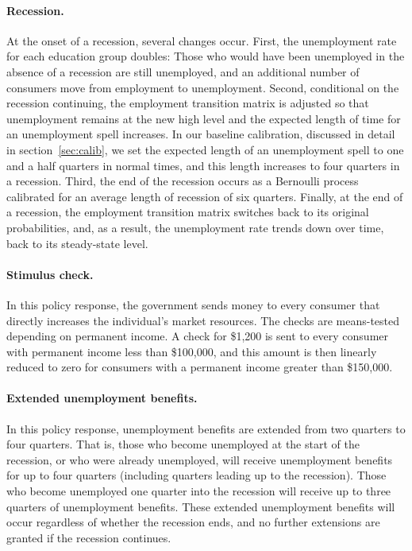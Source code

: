 \documentclass[\econtexRoot/EGMN]{subfiles}
\begin{document}
\paragraph{Recession.} At the onset of a recession, several changes occur. First, the unemployment rate for each education group doubles: Those who would have been unemployed in the absence of a recession are still unemployed, and an additional number of consumers move from employment to unemployment. Second, conditional on the recession continuing, the employment transition matrix is adjusted so that unemployment remains at the new high level and the expected length of time for an unemployment spell increases. In our baseline calibration, discussed in detail in section~\ref{sec:calib}, we set the expected length of an unemployment spell to one and a half quarters in normal times, and this length increases to four quarters in a recession. Third, the end of the recession occurs as a Bernoulli process calibrated for an average length of recession of six quarters. Finally, at the end of a recession, the employment transition matrix switches back to its original probabilities, and, as a result, the unemployment rate trends down over time, back to its steady-state level.

\paragraph{Stimulus check.} In this policy response, the government sends money to every consumer that directly increases the individual's market resources. The checks are means-tested depending on permanent income. A check for \$1,200 is sent to every consumer with permanent income less than \$100,000, and this amount is then linearly reduced to zero for consumers with a permanent income greater than \$150,000.

\paragraph{Extended unemployment benefits.} In this policy response, unemployment benefits are extended from two quarters to four quarters. That is, those who become unemployed at the start of the recession, or who were already unemployed, will receive unemployment benefits for up to four quarters (including quarters leading up to the recession). Those who become unemployed one quarter into the recession will receive up to three quarters of unemployment benefits. These extended unemployment benefits will occur regardless of whether the recession ends, and no further extensions are granted if the recession continues.
\end{document}
